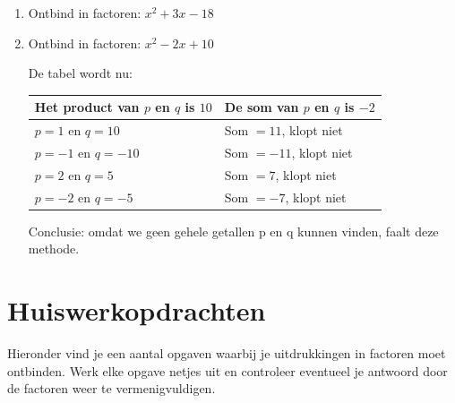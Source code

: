 \begin{enumerate}
    \item Ontbind in factoren: $x^2+3x-18$ 

    \item Ontbind in factoren: $x^2-2x+10$

    De tabel wordt nu:

    \begin{table}[H]
        \centering
        \renewcommand{\arraystretch}{1.4}
        \begin{tabular}{|l|l|}
            \hline
            \rowcolor{vakgray}
            \textbf{Het product van $p$ en $q$ is $10$} & \textbf{De som van $p$ en $q$ is $-2$} \\ \hline
            $p = 1$ en $q = 10$     & Som $= 11$, klopt niet \\ \hline
            $p = -1$ en $q = -10$   & Som $= -11$, klopt niet \\ \hline
            $p = 2$ en $q = 5$      & Som $= 7$, klopt niet \\ \hline
            $p = -2$ en $q = -5$    & Som $= -7$, klopt niet \\ \hline
        \end{tabular}
    \end{table}

    Conclusie: omdat we geen gehele getallen p en q kunnen vinden, faalt deze methode.
\end{enumerate}

\newpage
\section{Huiswerkopdrachten}
Hieronder vind je een aantal opgaven waarbij je uitdrukkingen in factoren moet ontbinden. Werk elke opgave netjes uit en controleer eventueel je antwoord door de factoren weer te vermenigvuldigen.

